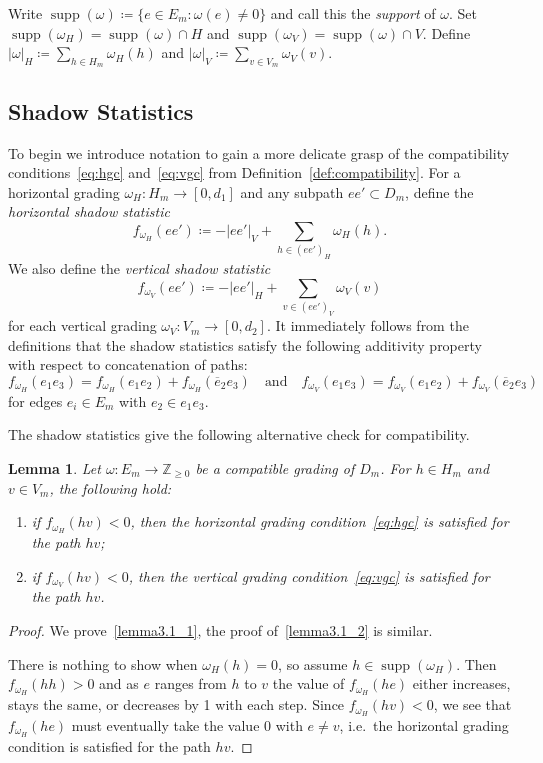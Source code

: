 \documentclass[10pt]{amsart}
\newtheorem{lemma}[theorem]{Lemma}
\theoremstyle{definition}
\newcommand{\ie}{i.e.\ }
\newcommand{\ZZ}{\mathbb{Z}}
\DeclareMathOperator{\supp}{supp}
\begin{document}
Write $\supp(\omega)\coloneqq \{e\in E_m:\omega(e)\ne0\}$ and call this the \emph{support} of $\omega$.
Set $\supp(\omega_H)=\supp(\omega)\cap H$ and $\supp(\omega_V)=\supp(\omega)\cap V$.
Define $|\omega|_H\coloneqq \sum\limits_{h\in H_m} \omega_H(h)$ and $|\omega|_V\coloneqq \sum\limits_{v\in V_m} \omega_V(v)$. 

\subsection{Shadow Statistics}
\label{sec:shadows}
To begin we introduce notation to gain a more delicate grasp of the compatibility conditions~\eqref{eq:hgc} and~\eqref{eq:vgc} from Definition~\ref{def:compatibility}.
For a horizontal grading $\omega_H:H_m\to[0,d_1]$ and any subpath $ee'\subset D_m$, define the \emph{horizontal shadow statistic}
\[f_{\omega_H}(ee')\coloneqq -|ee'|_V+\sum\limits_{h\in(ee')_H}\omega_H(h).\]
We also define the \emph{vertical shadow statistic}
\[f_{\omega_V}(ee')\coloneqq -|ee'|_H+\sum\limits_{v\in(ee')_V}\omega_V(v)\]
for each vertical grading $\omega_V:V_m\to[0,d_2]$. 
It immediately follows from the definitions that the shadow statistics satisfy the following additivity property with respect to concatenation of paths:
\begin{equation}
 \label{eq:shadow statistic concatenation}
 f_{\omega_H}(e_1e_3)=f_{\omega_H}(e_1e_2)+f_{\omega_H}(\overline{e}_2e_3)\quad\text{and}\quad f_{\omega_V}(e_1e_3)=f_{\omega_V}(e_1e_2)+f_{\omega_V}(\overline{e}_2e_3)
\end{equation}
for edges $e_i\in E_m$ with $e_2\in e_1e_3$.

The shadow statistics give the following alternative check for compatibility.
\begin{lemma}
 \label{le:compatibility inequality}
 Let $\omega:E_m\to\ZZ_{\ge0}$ be a compatible grading of $D_m$. For $h\in H_m$ and $v\in V_m$, the following hold:
 \begin{enumerate}[label=(\alph*)]
 \item\label{lemma3.1_1} if $f_{\omega_H}(hv)<0$, then the horizontal grading condition~\eqref{eq:hgc} is satisfied for the path $hv$;
 \item\label{lemma3.1_2} if $f_{\omega_V}(hv)<0$, then the vertical grading condition~\eqref{eq:vgc} is satisfied for the path $hv$.
 \end{enumerate}
\end{lemma}
\begin{proof}
 We prove~\ref{lemma3.1_1}, the proof of~\ref{lemma3.1_2} is similar.
 
 There is nothing to show when $\omega_H(h)=0$, so assume $h\in\supp(\omega_H)$.
 Then $f_{\omega_H}(hh)>0$ and as $e$ ranges from $h$ to $v$ the value of $f_{\omega_H}(he)$ either increases, stays the same, or decreases by 1 with each step.
 Since $f_{\omega_H}(hv)<0$, we see that $f_{\omega_H}(he)$ must eventually take the value 0 with $e\ne v$, \ie the horizontal grading condition is satisfied for the path $hv$.
\end{proof}
\end{document}

